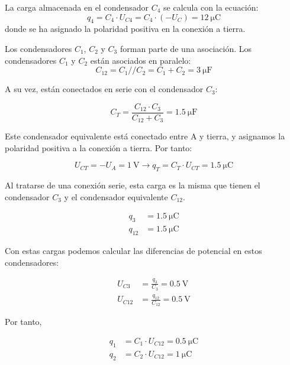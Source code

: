 \documentclass[10pt]{article}
\begin{document}
La carga almacenada en el condensador $C_4$ se calcula con la ecuación:
\begin{equation*}
  q_4 = C_4 \cdot U_{C4} = C_4 \cdot (-U_C) = \SI{12}{\micro\coulomb}
\end{equation*}
donde se ha asignado la polaridad positiva en la conexión a tierra.

Los condensadores $C_1$, $C_2$ y $C_3$ forman parte de una asociación. Los condensadores $C_1$ y $C_2$ están asociados en paralelo:
\begin{equation*}
  C_{12} = C_1//C_2 = C_1 + C_2 = \SI{3}{\micro\farad}
\end{equation*}

A su vez, están conectados en serie con el condensador $C_3$:

\begin{equation*}
  C_T = \frac{C_{12} \cdot C_3}{C_{12} + C_3} = \SI{1.5}{\micro\farad}
\end{equation*}

Este condensador equivalente está conectado entre A y tierra, y asignamos la polaridad positiva a la conexión a tierra. Por tanto:

\begin{equation*}
  U_{CT} = -U_A = \SI{1}{\volt} \rightarrow q_T = C_T \cdot U_{CT} = \SI{1.5}{\micro\coulomb}
\end{equation*}

Al tratarse de una conexión serie, esta carga es la misma que tienen el condensador $C_3$ y el condensador equivalente $C_{12}$.

\begin{align*}
  q_3 &=  \SI{1.5}{\micro\coulomb}\\
  q_{12} &=  \SI{1.5}{\micro\coulomb}
\end{align*}

Con estas cargas podemos calcular las diferencias de potencial en estos condensadores:

\begin{align*}
  U_{C3} &=  \frac{q_3}{C_3} = \SI{0.5}{\volt}\\
  U_{C12} &=  \frac{q_{12}}{C_{12}} = \SI{0.5}{\volt}
\end{align*}

Por tanto,

\begin{align*}
  q_1 &= C_1 \cdot U_{C12} = \SI{0.5}{\micro\coulomb}\\
  q_2 &= C_2 \cdot U_{C12} = \SI{1}{\micro\coulomb}
\end{align*}
\end{document}

